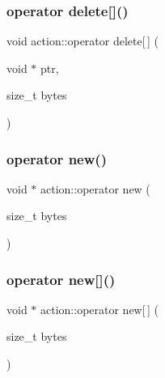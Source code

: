 \mbox{\label{classaction_ad0cc09cee17deeb2fa74b219e7920122}} 
\subsubsection{\texorpdfstring{operator delete[]()}{operator delete[]()}}
{\footnotesize\ttfamily void action\+::operator delete\mbox{[}$\,$\mbox{]} (\begin{DoxyParamCaption}\item[{void $\ast$}]{ptr,  }\item[{size\+\_\+t}]{bytes }\end{DoxyParamCaption})}

\mbox{\label{classaction_a075a7c4866b659ccb3af04569ae9e59d}} 
\subsubsection{\texorpdfstring{operator new()}{operator new()}}
{\footnotesize\ttfamily void $\ast$ action\+::operator new (\begin{DoxyParamCaption}\item[{size\+\_\+t}]{bytes }\end{DoxyParamCaption})}

\mbox{\label{classaction_a90bb958cc0073b8c46f246f256428514}} 
\subsubsection{\texorpdfstring{operator new[]()}{operator new[]()}}
{\footnotesize\ttfamily void $\ast$ action\+::operator new\mbox{[}$\,$\mbox{]} (\begin{DoxyParamCaption}\item[{size\+\_\+t}]{bytes }\end{DoxyParamCaption})}

\mbox{\label{classaction_a66621a819fc6e96493dbc22e285e5e80}} 
